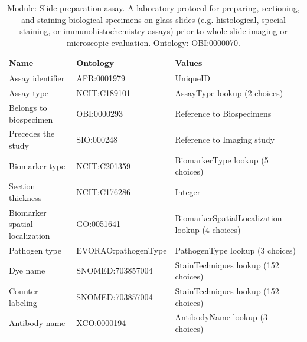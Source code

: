 \documentclass{article}
\begin{document}
\begin{table}[htb]
\begin{tabular}{lll}
Name & Ontology & Values \\
\hline
Assay identifier & AFR:0001979 & UniqueID \\
Assay type & NCIT:C189101 & AssayType lookup (2 choices) \\
Belongs to biospecimen & OBI:0000293 & Reference to Biospecimens \\
Precedes the study & SIO:000248 & Reference to Imaging study \\
Biomarker type & NCIT:C201359 & BiomarkerType lookup (5 choices) \\
Section thickness & NCIT:C176286 & Integer \\
Biomarker spatial localization & GO:0051641 & BiomarkerSpatialLocalization lookup (4 choices) \\
Pathogen type & EVORAO:pathogenType & PathogenType lookup (3 choices) \\
Dye name & SNOMED:703857004 & StainTechniques lookup (152 choices) \\
Counter labeling & SNOMED:703857004 & StainTechniques lookup (152 choices) \\
Antibody name & XCO:0000194 & AntibodyName lookup (3 choices) \\
\hline
\end{tabular}
\caption[Module: Slide preparation assay]{\label{table:table10} Module: Slide preparation assay. A laboratory protocol for preparing, sectioning, and staining biological specimens on glass slides (e.g. histological, special staining, or immunohistochemistry assays) prior to whole slide imaging or microscopic evaluation. Ontology: OBI:0000070. }
\end{table}
\end{document}
